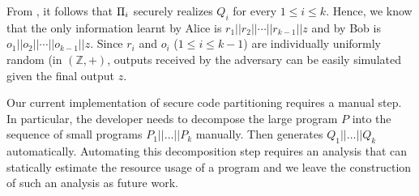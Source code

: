  From , it follows that $\Pi_i$ securely realizes $Q_i$ for every $1\leq i\leq k$. Hence, we know that the only information learnt by Alice is $r_1||r_2||\cdots||r_{k-1}||z$ and by Bob is $o_1||o_2||\cdots||o_{k-1}||z$. Since $r_i$ and $o_i$ ($1\leq i\leq k-1$) are individually uniformly random (in $(\mathbb{Z},+)$, outputs received by the adversary can be easily simulated given the final output $z$. 

Our current implementation of secure code partitioning requires a manual step.
In particular, the developer needs to decompose the large program $P$ into 
the sequence of small programs $P_1||\ldots||P_k$ manually.
Then \tool generates $Q_1||\ldots||Q_k$ automatically.
Automating this decomposition step requires an analysis that can 
statically estimate the resource usage of a \tool program and we leave the construction of such
an analysis as future work.